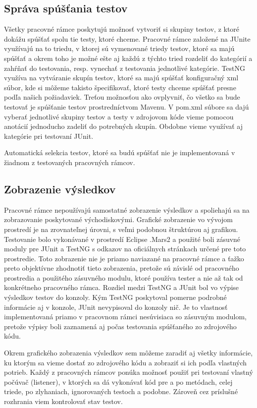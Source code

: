 \documentclass[11pt,twoside,slovak,a4paper]{article}
\begin{document}
	\subsection{Správa spúšťania testov}
	Všetky pracovné rámce poskytujú možnosť vytvoriť si skupiny testov, z ktoré dokážu spúšťať spolu tie testy, ktoré chceme. Pracovné rámce založené na JUnite využívajú na to triedu, v ktorej sú vymenované triedy testov, ktoré sa majú spúšťať a okrem toho je možné ešte aj každú z týchto tried rozdeliť do kategórií a zahŕňať do testovania, resp. vynechať z testovania jednotlivé kategórie.
	TestNG využíva na vytváranie skupín testov, ktoré sa majú spúšťať konfiguračný xml súbor, kde si môžeme takisto špecifikovať, ktoré testy chceme spúšťať presne podľa našich požiadaviek.
	Treťou možnosťou ako ovplyvniť, čo všetko sa bude testovať je spúšťanie testov prostredníctvom Mavenu. V pom.xml súbore sa dajú vyberať jednotlivé skupiny testov a testy v zdrojovom kóde vieme pomocou anotácií jednoducho zadeliť do potrebných skupín. Obdobne vieme využívať aj kategórie pri testovaní JUnit.
	
	Automatická selekcia testov, ktoré sa budú spúšťať nie je implementovaná v žiadnom z testovaných pracovných rámcov.
	
	\subsection{Zobrazenie výsledkov}
	Pracovné rámce nepoužívajú samostatné zobrazenie výsledkov a spoliehajú sa na zobrazovanie poskytované východiskovými. Grafické zobrazenie vo vývojom prostredí je na zrovnateľnej úrovni, s veľmi podobnou štruktúrou aj grafikou. Testovanie bolo vykonávané v prostredí Eclipse .Mars2 a použité boli zásuvné moduly pre JUnit a TestNG s odkazov na oficiálnych stránkach určené pre toto prostredie. Toto zobrazenie nie je priamo naviazané na pracovné rámce a ťažko preto objektívne zhodnotiť tieto zobrazenia, pretože sú závislé od pracovného prostredia a použitého zásuvného modulu, ktoré používa tester a nie až tak od konkrétneho pracovného rámca.
	Rozdiel medzi TestNG a JUnit bol vo výpise výsledkov testov do konzoly. Kým TestNG poskytoval pomerne podrobné informácie aj v konzole, JUnit nevypisoval do konzoly nič. Je to vlastnosť implementovaná priamo v pracovnom rámci nesúvisiaca so zásuvným modulom, pretože výpisy boli zaznamená aj počas testovania spúšťaného zo zdrojového kódu.
	
	Okrem grafického zobrazenia výsledkov sem môžeme zaradiť aj všetky informácie, ku ktorým sa vieme dostať zo zdrojového kódu a zobraziť si ich podľa vlastných potrieb. Každý z pracovných rámcov ponúka možnosť použiť pri testovaní vlastný počúvač (listener), v ktorých sa dá vykonávať kód pre a po metódach, celej triede, po zlyhaniach, ignorovaných testoch a podobne. Zároveň cez príslušné rozhrania viem kontrolovať stav testov.
	
\end{document}
